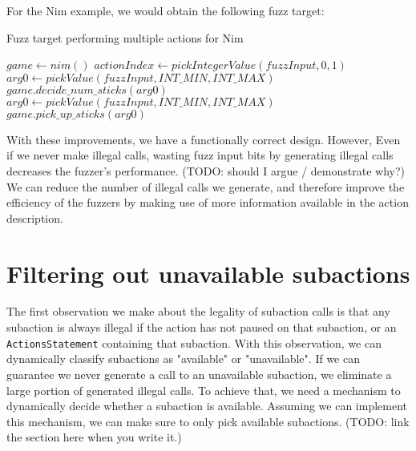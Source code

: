 For the Nim example, we would obtain the following fuzz target:
\begin{algorithm}[H]
    \caption{Fuzz target performing multiple actions for Nim}
    \begin{algorithmic}[1]
    \STATE $game \gets nim()$
        \STATE $actionIndex \gets pickIntegerValue(fuzzInput, 0, 1)$
            \STATE $arg0 \gets pickValue(fuzzInput, INT\_MIN, INT\_MAX)$
                \STATE $game.decide\_num\_sticks(arg0)$
            \ENDIF
        \ENDIF
            \STATE $arg0 \gets pickValue(fuzzInput, INT\_MIN, INT\_MAX)$
                \STATE $game.pick\_up\_sticks(arg0)$
            \ENDIF
        \ENDIF
    \ENDWHILE
    \end{algorithmic}
\end{algorithm}

With these improvements, we have a functionally correct design.
However, Even if we never make illegal calls, wasting fuzz input bits by generating illegal calls decreases the fuzzer's performance. (TODO: should I argue / demonstrate why?)
We can reduce the number of illegal calls we generate, and therefore improve the efficiency of the fuzzers by making use of more information available in the action description.

\section{Filtering out unavailable subactions}
The first observation we make about the legality of subaction calls is that any subaction is always illegal if the action has not paused on that subaction, or an \texttt{ActionsStatement} containing that subaction.
With this observation, we can dynamically classify subactions as "available" or "unavailable".
If we can guarantee we never generate a call to an unavailable subaction, we eliminate a large portion of generated illegal calls.
To achieve that, we need a mechanism to dynamically decide whether a subaction is available.
Assuming we can implement this mechanism, we can make sure to only pick available subactions. (TODO: link the section here when you write it.)

